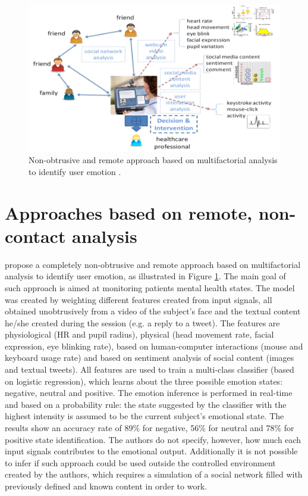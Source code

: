 \begin{figure}
\centering
\includegraphics[width=0.9\linewidth]{Content/figures/zhou.png}
\caption{Non-obtrusive and remote approach based on multifactorial analysis to identify user emotion \textcite{mental}.}
\label{fig:zhou}
\end{figure}

\section{Approaches based on remote, non-contact analysis}

\textcite{mental} propose a completely non-obtrusive and remote approach based on multifactorial analysis to identify user emotion, as illustrated in Figure \ref{fig:zhou}. The main goal of such approach is aimed at monitoring patients mental health states. The model was created by weighting different features created from input signals, all obtained unobtrusively from a video of the subject's face and the textual content he/she created during the session (e.g. a reply to a tweet). The features are physiological (HR and pupil radius), physical (head movement rate, facial expression, eye blinking rate), based on human-computer interactions (mouse and keyboard usage rate) and based on sentiment analysis of social content (images and textual tweets). All features are used to train a multi-class classifier (based on logistic regression), which learns about the three possible emotion states: negative, neutral and positive. The emotion inference is performed in real-time and based on a probability rule: the state suggested by the classifier with the highest intensity is assumed to be the current subject's emotional state. The results show an accuracy rate of 89\% for negative, 56\% for neutral and 78\% for positive state identification. The authors do not specify, however, how much each input signals contributes to the emotional output. Additionally it is not possible to infer if such approach could be used outside the controlled environment created by the authors, which requires a simulation of a social network filled with previously defined and known content in order to work.

